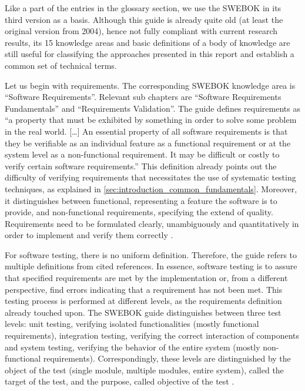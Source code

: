 Like a part of the entries in the glossary section, we use the SWEBOK in its third version as a basis.
Although this guide is already quite old (at least the original version from 2004), hence not fully compliant with current research results, its 15 knowledge areas and basic definitions of a body of knowledge are still useful for classifying the approaches presented in this report and establish a common set of technical terms.

Let us begin with requirements.
The corresponding SWEBOK knowledge area is \enquote{Software Requirements}.
Relevant sub chapters are \enquote{Software Requirements Fundamentals} and \enquote{Requirements Validation}.
The guide defines requirements as \enquote{a property that must be exhibited by something in order to solve some problem in the real world. [\ldots]
An essential property of all software requirements is that they be verifiable as an individual feature as a functional requirement or at the system level as a non-functional requirement.
It may be difficult or costly to verify certain software requirements.} \cite{SWEBOK}
This definition already points out the difficulty of verifying requirements that necessitates the use of systematic testing techniques, as explained in \autoref{sec:introduction_common_fundamentals}.
Moreover, it distinguishes between functional, representing a feature the software is to provide, and non-functional requirements, specifying the extend of quality.
Requirements need to be formulated clearly, unambiguously and quantitatively in order to implement and verify them correctly \cite{SWEBOK}.

For software testing, there is no uniform definition.
Therefore, the guide refers to multiple definitions from cited references.
In essence, software testing is to assure that specified requirements are met by the implementation or, from a different perspective, find errors indicating that a requirement has not been met.
This testing process is performed at different levels, as the requirements definition already touched upon. %
The SWEBOK guide distinguishes between three test levels: unit testing, verifying isolated functionalities (mostly functional requirements), integration testing, verifying the correct interaction of components and system testing, verifying the behavior of the entire system (mostly non-functional requirements).
Correspondingly, these levels are distinguished by the object of the test (single module, multiple modules, entire system), called the target of the test, and the purpose, called objective of the test \cite{SWEBOK}.


